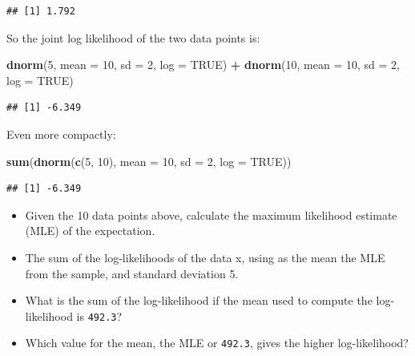 \documentclass[12pt,]{krantz}
\newenvironment{Shaded}{\begin{snugshade}}{\end{snugshade}}
\newcommand{\DataTypeTok}[1]{\textcolor[rgb]{0.13,0.29,0.53}{#1}}
\newcommand{\DecValTok}[1]{\textcolor[rgb]{0.00,0.00,0.81}{#1}}
\newcommand{\KeywordTok}[1]{\textcolor[rgb]{0.13,0.29,0.53}{\textbf{#1}}}
\newcommand{\NormalTok}[1]{#1}
\newcommand{\OperatorTok}[1]{\textcolor[rgb]{0.81,0.36,0.00}{\textbf{#1}}}
\newcommand{\OtherTok}[1]{\textcolor[rgb]{0.56,0.35,0.01}{#1}}
\newcommand{\StringTok}[1]{\textcolor[rgb]{0.31,0.60,0.02}{#1}}
\providecommand{\tightlist}{%
  \setlength{\itemsep}{0pt}\setlength{\parskip}{0pt}}
\begin{document}
\begin{verbatim}
## [1] 1.792
\end{verbatim}

So the joint log likelihood of the two data points is:

\begin{Shaded}
\begin{Highlighting}[]
\KeywordTok{dnorm}\NormalTok{(}\DecValTok{5}\NormalTok{, }\DataTypeTok{mean =} \DecValTok{10}\NormalTok{, }\DataTypeTok{sd =} \DecValTok{2}\NormalTok{, }\DataTypeTok{log =} \OtherTok{TRUE}\NormalTok{) }\OperatorTok{+}\StringTok{ }\KeywordTok{dnorm}\NormalTok{(}\DecValTok{10}\NormalTok{, }
  \DataTypeTok{mean =} \DecValTok{10}\NormalTok{, }\DataTypeTok{sd =} \DecValTok{2}\NormalTok{, }\DataTypeTok{log =} \OtherTok{TRUE}\NormalTok{)}
\end{Highlighting}
\end{Shaded}

\begin{verbatim}
## [1] -6.349
\end{verbatim}

Even more compactly:

\begin{Shaded}
\begin{Highlighting}[]
\KeywordTok{sum}\NormalTok{(}\KeywordTok{dnorm}\NormalTok{(}\KeywordTok{c}\NormalTok{(}\DecValTok{5}\NormalTok{, }\DecValTok{10}\NormalTok{), }\DataTypeTok{mean =} \DecValTok{10}\NormalTok{, }\DataTypeTok{sd =} \DecValTok{2}\NormalTok{, }\DataTypeTok{log =} \OtherTok{TRUE}\NormalTok{))}
\end{Highlighting}
\end{Shaded}

\begin{verbatim}
## [1] -6.349
\end{verbatim}

\begin{itemize}
\tightlist
\item
  Given the 10 data points above, calculate the maximum likelihood estimate (MLE) of the expectation.
\item
  The sum of the log-likelihoods of the data x, using as the mean the MLE from the sample, and standard deviation 5.
\item
  What is the sum of the log-likelihood if the mean used to compute the log-likelihood is \texttt{492.3}?
\item
  Which value for the mean, the MLE or \texttt{492.3}, gives the higher log-likelihood?
\end{itemize}
\end{document}
